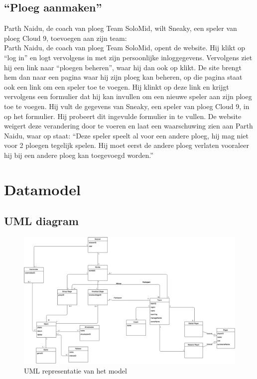 \documentclass[12pt,a4paper]{article}
\begin{document}
			\subsection{``Ploeg aanmaken''}
			Parth Naidu, de coach van ploeg Team SoloMid, wilt Sneaky, een speler van ploeg Cloud 9, toevoegen aan zijn team:
			\\
			Parth Naidu, de coach van ploeg Team SoloMid, opent de website. Hij klikt op ``log in'' en logt vervolgens in met zijn persoonlijke inloggegevens. Vervolgens ziet hij een link naar ``ploegen beheren'', waar hij dan ook op klikt. De site brengt hem dan naar een pagina waar hij zijn ploeg kan beheren, op die pagina staat ook een link om een speler toe te voegen. Hij klinkt op deze link en krijgt vervolgens een formulier dat hij kan invullen om een nieuwe speler aan zijn ploeg toe te voegen. Hij vult de gegevens van Sneaky, een speler van ploeg Cloud 9, in op het formulier. Hij probeert dit ingevulde formulier in te vullen. De website weigert deze verandering door te voeren en laat een waarschuwing zien aan Parth Naidu, waar op staat: ``Deze speler speelt al voor een andere ploeg, hij mag niet voor 2 ploegen tegelijk spelen. Hij moet eerst de andere ploeg verlaten vooraleer hij bij een andere ploeg kan toegevoegd worden.''
			
			\section{Datamodel}
			\subsection{UML diagram}
			\begin{figure}[H]
				\includegraphics[width=\textwidth]{../4-Datamodel/RE.png}
				\caption{UML representatie van het model}
			\end{figure}
\end{document}
